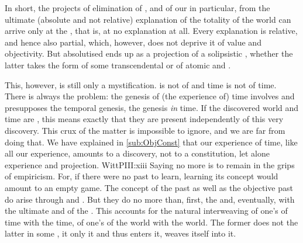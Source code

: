 In short, the projects of elimination of , and of our
 in particular, from the ultimate (absolute and not relative)
explanation of the totality of the world can arrive only at the , that is, at no explanation at all. Every explanation is relative, and
hence also partial, which, however, does not deprive it of value and
objectivity. But absolutised  ends up as a projection of a
solipsistic , whether the latter takes the form of some
transcendental  or of atomic  and
.


\pa This, however, is still only a mystification.  is not
 of  and  time is not
 of  time. 
%
There is always the problem: the genesis of (the experience of) time involves
and presupposes the temporal genesis, the genesis {\em in} time. If the
discovered world and time are , this means exactly that they are
present independently of this very discovery. This crux of the matter is
impossible to ignore, and we are far from doing that. We have explained in
\ref{sub:ObjConst} that our experience of time, like all our experience, amounts
to a discovery, not to a constitution, let alone  experience and
projection.  \citet{Man learns the concept of the past by
  remembering.}{WittPI}{II:xiii} Saying no more is to remain in the grips of
empiricism. For, if there were
no past to learn, learning its concept would amount to an empty game. The
concept of the past as well as the objective past do arise through  and .  But they do no more than, first,
 the  and, eventually,  with the
ultimate  and  of the .  This
accounts for the natural interweaving of one's  of time with the
 time, of one's  of the world with the
 world. The former does not  the latter in some
, it only  it and thus enters it,
weaves itself into it.

